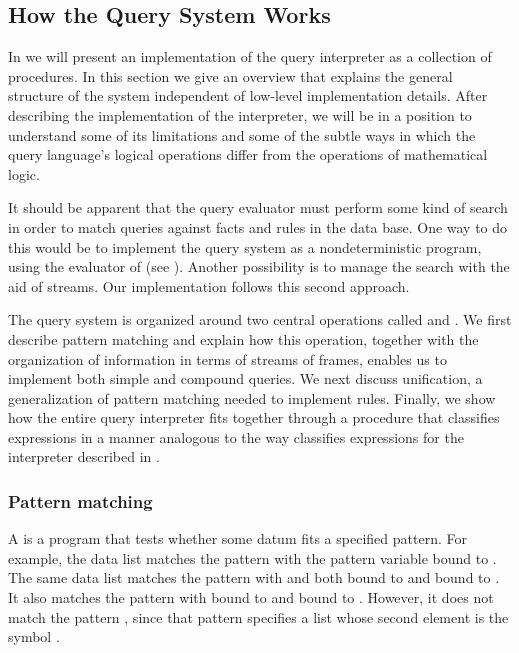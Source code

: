 \subsection{How the Query System Works}
\label{Section 4.4.2}

In  we will present an implementation of the query interpreter as a collection of procedures.
In this section we give an overview that explains the general structure of the system independent of low-level implementation details.
After describing the implementation of the interpreter, we will be in a position to understand some of its limitations and some of the subtle ways in which the query language’s logical operations differ from the operations of mathematical logic.

It should be apparent that the query evaluator must perform some kind of search in order to match queries against facts and rules in the data base.
One way to do this would be to implement the query system as a nondeterministic program, using the  evaluator of  (see ).
Another possibility is to manage the search with the aid of streams.
Our implementation follows this second approach.

The query system is organized around two central operations called  and .
We first describe pattern matching and explain how this operation, together with the organization of information in terms of streams of frames, enables us to implement both simple and compound queries.
We next discuss unification, a generalization of pattern matching needed to implement rules.
Finally, we show how the entire query interpreter fits together through a procedure that classifies expressions in a manner analogous to the way  classifies expressions for the interpreter described in .



\subsubsection*{Pattern matching}

A  is a program that tests whether some datum fits a specified pattern.
For example, the data list  matches the pattern  with the pattern variable  bound to .
The same data list matches the pattern  with  and  both bound to  and  bound to .
It also matches the pattern  with  bound to  and  bound to .
However, it does not match the pattern , since that pattern specifies a list whose second element is the symbol .

